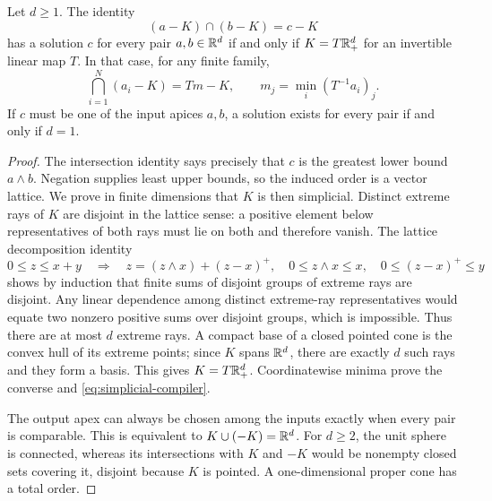\begin{proposition}\label{prop:cone-meet}
Let $d\geq1$. The identity
\[
 (a-K)\cap(b-K)=c-K
\]
has a solution $c$ for every pair $a,b\in\mathbb R^d$ if and only if
$K=T\mathbb R_+^d$ for an invertible linear map $T$. In that case, for any finite
family,
\begin{equation}\label{eq:simplicial-compiler}
 \bigcap_{i=1}^N(a_i-K)=Tm-K,
 \qquad m_j=\min_i(T^{-1}a_i)_j.
\end{equation}
If $c$ must be one of the input apices $a,b$, a solution exists for
every pair if and only if $d=1$.
\end{proposition}
\begin{proof}
The intersection identity says precisely that $c$ is the greatest lower
bound $a\wedge b$. Negation supplies least upper bounds, so the induced
order is a vector lattice. We prove in finite dimensions that $K$
is then simplicial. Distinct extreme rays of $K$ are disjoint in the
lattice sense: a positive element below representatives of both rays
must lie on both and therefore vanish. The lattice decomposition identity
\[
 0\leq z\leq x+y
 \quad\Longrightarrow\quad
 z=(z\wedge x)+(z-x)^+,
 \quad 0\leq z\wedge x\leq x,
 \quad 0\leq(z-x)^+\leq y
\]
shows by induction that finite sums of disjoint groups of extreme rays
are disjoint. Any linear dependence among distinct extreme-ray
representatives would equate two nonzero positive sums over disjoint
groups, which is impossible. Thus there are at most $d$ extreme rays.
A compact base of a closed pointed cone is the convex hull of its extreme
points; since $K$ spans $\mathbb R^d$, there are exactly $d$ such rays and they
form a basis. This gives $K=T\mathbb R_+^d$. Coordinatewise minima prove the
converse and \eqref{eq:simplicial-compiler}.

The output apex can always be chosen among the inputs exactly when every
pair is comparable. This is equivalent to $K\cup(-K)=\mathbb R^d$. For $d\geq2$, the
unit sphere is connected, whereas its intersections with $K$ and $-K$
would be nonempty closed sets covering it, disjoint because $K$ is
pointed. A one-dimensional proper cone has a total order.
\end{proof}

